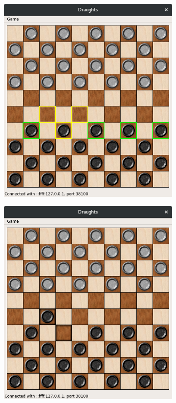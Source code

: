 \documentclass[11pt,a4paper]{article}
\begin{document}
\begin{figure}[H]
\begin{subfigure}{.24\textwidth}
		\includegraphics[width=\linewidth]{img2.png}
		\caption{}
	\end{subfigure}
	\hfill
	\begin{subfigure}{.24\textwidth}
		\centering
		\includegraphics[width=\linewidth]{img3.png}

\end{subfigure}
\end{figure}
\end{document}
